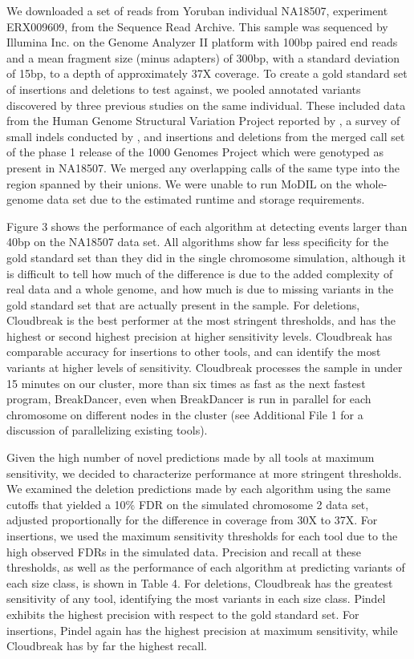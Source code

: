 \documentclass[10pt]{bmc_article}
\newenvironment{bmcformat}{\fussy\setboolean{publ}{true}}{\fussy}
\begin{document}
\begin{bmcformat}
We downloaded a set of reads from Yoruban individual NA18507, experiment ERX009609, from the Sequence Read Archive. This sample was sequenced by Illumina Inc. on the Genome Analyzer II platform with 100bp paired end reads and a mean fragment size (minus adapters) of 300bp, with a standard deviation of 15bp, to a depth of approximately 37X coverage. To create a gold standard set of insertions and deletions to test against, we pooled annotated variants discovered by three previous studies on the same individual. These included data from the Human Genome Structural Variation Project reported by \cite{Kidd:2008p926}, a survey of small indels conducted by \cite{Mills:2011fi}, and insertions and deletions from the merged call set of the phase 1 release of the 1000 Genomes Project \cite{GenomesProjectConsortium:2012co} which were genotyped as present in NA18507. We merged any overlapping calls of the same type into the region spanned by their unions. We were unable to run MoDIL on the whole-genome data set due to the estimated runtime and storage requirements.

Figure 3 shows the performance of each algorithm at detecting events larger than 40bp on the NA18507 data set. All algorithms show far less specificity for the gold standard set than they did in the single chromosome simulation, although it is difficult to tell how much of the difference is due to the added complexity of real data and a whole genome, and how much is due to missing variants in the gold standard set that are actually present in the sample. For deletions, Cloudbreak is the best performer at the most stringent thresholds, and has the highest or second highest precision at higher sensitivity levels. Cloudbreak has comparable accuracy for insertions to other tools, and can identify the most variants at higher levels of sensitivity. Cloudbreak processes the sample in under 15 minutes on our cluster, more than six times as fast as the next fastest program, BreakDancer, even when BreakDancer is run in parallel for each chromosome on different nodes in the cluster (see Additional File 1 for a discussion of parallelizing existing tools).

Given the high number of novel predictions made by all tools at maximum sensitivity, we decided to characterize performance at more stringent thresholds. We examined the deletion predictions made by each algorithm using the same cutoffs that yielded a 10\% FDR on the simulated chromosome 2 data set, adjusted proportionally for the difference in coverage from 30X to 37X. For insertions, we used the maximum sensitivity thresholds for each tool due to the high observed FDRs in the simulated data. Precision and recall at these thresholds, as well as the performance of each algorithm at predicting variants of each size class, is shown in Table 4. For deletions, Cloudbreak has the greatest sensitivity of any tool, identifying the most variants in each size class. Pindel exhibits the highest precision with respect to the gold standard set. For insertions, Pindel again has the highest precision at maximum sensitivity, while Cloudbreak has by far the highest recall.


\end{bmcformat}
\end{document}
